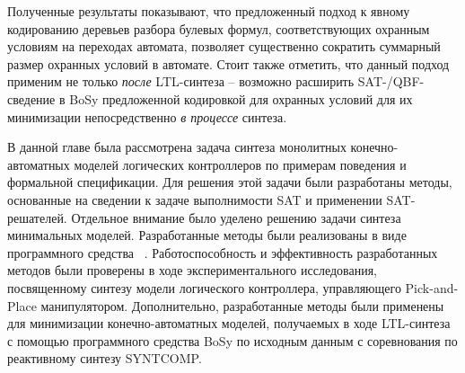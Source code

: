Полученные результаты показывают, что предложенный подход к явному кодированию деревьев разбора булевых формул, соответствующих охранным условиям на переходах автомата, позволяет существенно сократить суммарный размер охранных условий в автомате.
Стоит также отметить, что данный подход применим не только \emph{после} LTL-синтеза \--- возможно расширить SAT-/QBF-сведение в BoSy предложенной кодировкой для охранных условий для их минимизации непосредственно \emph{в процессе} синтеза.


\chapterconclusion

В данной главе была рассмотрена задача синтеза монолитных конечно-автоматных моделей логических контроллеров по примерам поведения и формальной спецификации.
Для решения этой задачи были разработаны методы, основанные на сведении к задаче выполнимости SAT и применении SAT-решателей.
Отдельное внимание было уделено решению задачи синтеза минимальных моделей.
Разработанные методы были реализованы в виде программного средства ~\cite{fbSAT-tool}.
Работоспособность и эффективность разработанных методов были проверены в ходе экспериментального исследования, посвященному синтезу модели логического контроллера, управляющего Pick-and-Place манипулятором.
Дополнительно, разработанные методы были применены для минимизации конечно-автоматных моделей, получаемых в ходе LTL-синтеза с помощью программного средства BoSy по исходным данным с соревнования по реактивному синтезу SYNTCOMP\@.



\FloatBarrier
